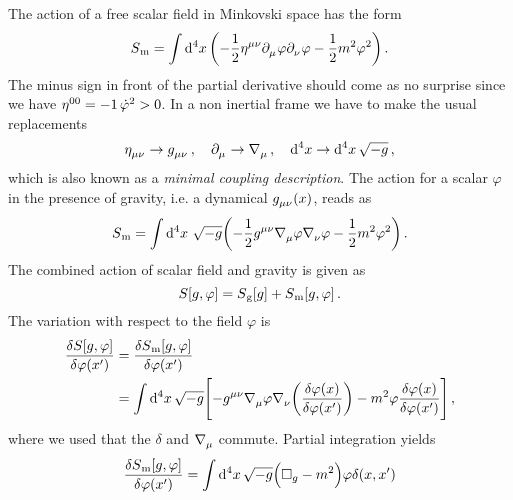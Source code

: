 \begin{example}
The action of a free scalar field in Minkovski space has the form
\begin{equation}
S\textsubscript{m}=\fourint  \left(-\frac{1}{2}\tensor{\eta}{^\mu^\nu}
\tensor{\partial}{_\mu}\varphi\tensor{\partial}{_\nu}\varphi-\frac{1}{2}m^2\varphi^2\right)\,.
\end{equation}
The minus sign in front of the partial derivative should come as no surprise
since we have $\tensor{\eta}{^0^0}=-1\, \dot{\varphi}^2>0$. In a non inertial
frame we have to make the usual replacements
\begin{equation}
\tensor{\eta}{_\mu_\nu}\to \tensor{g}{_\mu_\nu}\, , \quad
\tensor{\partial}{_\mu}\to
\tensor{\nabla}{_\mu}\,, \quad \dif{}^4 x \to \dif{}^4 x\, \sqrt{-g}\, ,
\end{equation}
which is also known as a \emph{minimal coupling description}. The action for a
scalar $\varphi$ in the presence of gravity, 
i.e. a dynamical $\tensor{g}{_\mu_\nu}(x)$, reads as
\begin{equation}
S\textsubscript{m}=\fourint\, 
\sqrt{-g}\left(-\frac{1}{2}\tensor{g}{^\mu^\nu} \tensor{\nabla}{_\mu}\varphi\tensor{\nabla}{_\nu}\varphi
-\frac{1}{2}m^2\varphi^2\right)\,.
\end{equation}
 The combined action of scalar field and
gravity is given as
\begin{equation}
S[g,\varphi]=S\textsubscript{g}[g]+S\textsubscript{m}[g,\varphi]\,.
\end{equation}
The variation with respect to the field $\varphi$ is 
\begin{equation}
\begin{split}
\frac{\delta S[g,\varphi]}{\delta
\varphi\left(x'\right)}&=\frac{\delta S\textsubscript{m}[g,\varphi]}{\delta
\varphi\left(x'\right)}\\
&=\fourint\sqrt{-g}\left[-\tensor{g}{^\mu^\nu}
\tensor{\nabla}{_\mu}\varphi\tensor{\nabla}{_\nu}\left(\frac{\delta
\varphi(x)}{\delta \varphi\left(x'\right)}\right)-m^2\varphi\frac{\delta
\varphi(x)}{\delta \varphi\left(x'\right)}\right]\,,
\end{split}
\end{equation}
where we used that the $\delta$ and $\tensor{\nabla}{_\mu}$ commute. Partial
integration yields
\begin{equation}
\begin{split}
\frac{\delta S\textsubscript{m}[g,\varphi]}{\delta \varphi\left(x'\right)}&=\fourint \sqrt{-g}\left(\square_{g}-m^2\right)\varphi\delta(x,x')\\

\end{split}
\end{equation}
\end{example}
